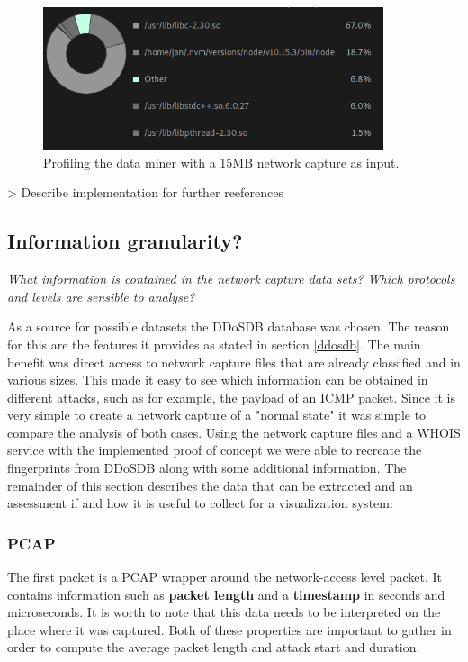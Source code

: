     \begin{figure}[profiling]
    \centering
    \includegraphics[width=10cm]{images/profiling.png}
    \caption{Profiling the data miner with a 15MB network capture as input.}
    \label{fig:profiling}
\end{figure}

> Describe implementation for further reeferences
    
\subsection{Information granularity?}
\textit{What information is contained in the network capture data sets? Which protocols and levels are sensible to analyse?
}

As a source for possible datasets the DDoSDB database was chosen. The reason for this are the features it provides as stated in section \ref{ddosdb}. The main benefit was direct access to network capture files that are already classified and in various sizes. This made it easy to see which information can be obtained in different attacks, such as for example, the payload of an ICMP packet. Since it is very simple to create a network capture of a "normal state" it was simple to compare the analysis of both cases.
Using the network capture files and a WHOIS service with the implemented proof of concept we were able to recreate the fingerprints from DDoSDB along with some additional information. The remainder of this section describes the data that can be extracted and an assessment if and how it is useful to collect for a visualization system:
\subsubsection{PCAP}
The first packet is a PCAP wrapper around the network-access level packet. It contains information such as \textbf{packet length} and a \textbf{timestamp} in seconds and microseconds. It is worth to note that this data needs to be interpreted on the place where it was captured.
Both of these properties are important to gather in order to compute the average packet length and attack start and duration.
